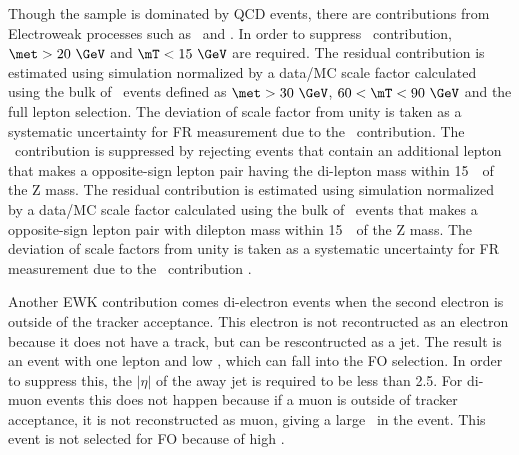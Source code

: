 Though the sample is dominated by QCD 
events, there are contributions from Electroweak processes such as \Wjets\ and \dyll. 
In order to suppress \Wjets\ contribution, $\met>20~\GeV$ and $\mT<15~\GeV$ are required. 
The residual contribution is estimated using simulation normalized by a data/MC scale factor 
calculated using the bulk of \Wjets\ events defined as $\met>30~\GeV$, $60<\mT<90~\GeV$ 
and the full lepton selection. The deviation of scale factor from unity 
is taken as a systematic uncertainty for FR measurement due to the \Wjets\ contribution.
The \dyll\ contribution is suppressed by rejecting events 
that contain an additional lepton that makes a opposite-sign lepton pair 
having the di-lepton mass within 15~\GeV\ of the Z mass.  
The residual contribution is estimated using simulation normalized by a data/MC scale factor
calculated using the bulk of \dyll\ events that makes a opposite-sign lepton 
pair with dilepton mass within 15~\GeV\ of the Z mass.
The deviation of scale factors from unity
is taken as a systematic uncertainty for FR measurement due to the \dyll\ contribution .

Another EWK contribution comes di-electron events when the second electron 
is outside of the tracker acceptance. This electron is not recontructed 
as an electron because it does not have a track, but can be rescontructed 
as a jet. The result is an event with one lepton and low \met, which 
can fall into the FO selection. In order to suppress this, the $\left| \eta \right|$ 
of the away jet is required to be less than 2.5. For di-muon events 
this does not happen because if a muon is outside of tracker acceptance, 
it is not reconstructed as muon, giving a large \met\ in the event. 
This event is not selected for FO because of high \met. 

